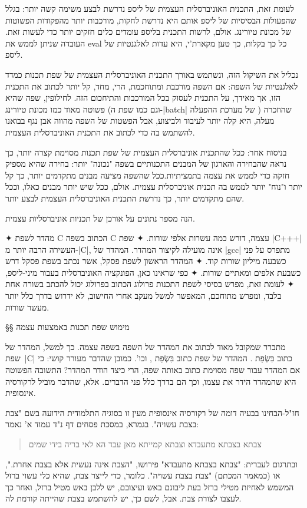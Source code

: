 לעומת זאת, התכנית האוניברסלית העצמית של ליספ נדרשת לבצע משימה קשה יותר: בגלל
שהפעולות הבסיסיות של ליספ אותם היא נדרשת לחקות, מורכבות יותר מהפקודות הפשוטות
של מכונת טיורינג. אולם, לרשות התכנית בליספ עומדים כלים חזקים יותר כדי לעשות
זאת. העובדה שניתן לממש את eval כל כך בקלות, כך טען מקארת'י, היא עדות לאלגנטיות
של ליספ.

נכליל את השיקול הזה, ונשתמש באורך התכנית האוניברסלית העצמית של שפת תכנות כמדד
לאלגנטיות של השפה: אם השפה מורכבת ומתוחכמת, הרי, מחד, קל יותר לכתוב את התכנית
הזו, אך מאידך, על התכנית לעסוק בכל המורכבות והתיחכום הזה. לחילופין, שפה שהיא
פשוטה מאוד כמו מכונת טיורינג (וגם כמו שפת ה-\E|batch| של מערכת ההפעלה )
שהוזכרה מעלה, היא קלה יותר לעיבוד ולביצוע, אבל הפשטות של השפה מהווה אבן נגף
בבואנו להשתמש בה כדי לכתוב את התכנית האוניברסלית העצמית.

בניסוח אחר: ככל שהתכנית אוניברסלית העצמית של שפת תכנות מסוימת קצרה יותר, כך
נראה שהבחירה והארגון של המבנים התכנותיים בשפה "נכונה" יותר: בחירה שהיא מספיק
חזקה כדי לממש את עצמה בתמציתיות.ככל שהשפה מציעה מבנים מתקדמים יותר, כך קל יותר
ו"נוח" יותר לממש בה תכנית אוניברסלית עצמית. אולם, ככל שיש יותר מבנים כאלו, וככל
שהם מתקדמים יותר, כך נדרשת התכנית האוניברסלית העצמית לבצע יותר.

הנה מספר נתונים על אורכן של תכניות אוניברסליות עצמית.
\begin{enumerate}
    ✦ מהדר לשפת C הכתוב בשפה C עצמה, דורש כמה עשרות אלפי שורות.
    ✦ שפת \E|C+++| העשירה הרבה יותר מ-\E|C|, אינה מועילה לקיצור המהדר. המהדר
    של \E|gcc| מתפרס על פני כשבעה מיליון שורות קוד.
    ✦ המהדר הראשון לשפת פסקל, אשר נכתב בשפת פסקל דרש כשבעת אלפים ומאתיים שורות.
    ✦ כפי שראינו כאן, הפונקציה האוניברסלית  בעבור מיני-ליספ,
    ✦ לעומת זאת, מפרש בסיסי לשפת התכנות פרולוג הכתוב בפרולוג יכול להכתב בשורה
    אחת בלבד, ומפרש מתוחכם, המאפשר למשל מעקב אחרי החישוב, לא ידרוש בדרך כלל
    יותר מעשר שורות.
\end{enumerate}

§§ מימוש שפת תכנות באמצעות עצמה

מתברר שמקובל מאוד לכתוב את המהדר של השפה בשפה עצמה. כך למשל, המהדר של שפת~\E|C|
כתוב בִּשְׂפַת . המהדר של שפת  כתוב בִּשְׂפַת , וכו'. כמובן שהדבר מעורר
קושי: כי אם המהדר עבור שפה מסוימת כתוב באותה שפה, הרי כיצד הודר המהדר? התשובה
הפשוטה היא שהמהדר הידר את עצמו, וכך הם בדרך כלל פני הדברים. אלא, שהדבר מוביל
לרקורסיה אינסופית.

חז"ל-הבחינו בבעיה דומה של רקורסיה אינסופית מעין זו בסוגיה התלמודית הידועה בשם
"צבת בצבת עשויה". בגמרא, במסכת פסחים דף נ"ד עמוד א' נאמר:
\begin{quote}
צבתא בצבתא מתעבדא וצבתא קמייתא מאן עבד הא לאי בריה בידי שמים
\end{quote}
ובתרגום לעברית: "צבתא בצבתא מתעבדא" פירושו, "הצבת אינה נעשית אלא בצבת אחרת.",
או (כמאמר המכתם) "צבת בצבת עשויה". כלומר, כדי לייצר צבת, שהיא כלי עשוי ברזל
המשמש לאחיזת מטילי ברזל בעת ליבונם באש ועיצובם, יש ללבן באש מטיל ברזל, ואחר כך
לעצבו לצורת צבת. אבל, לשם כך, יש להשתמש בצבת שהייתה קודמת לה.

